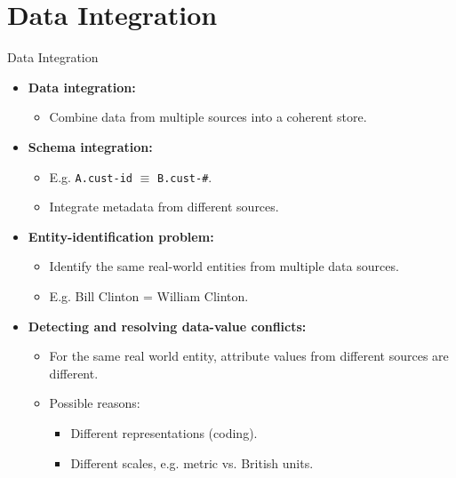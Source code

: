 \section{Data Integration}

\begin{frame}{Data Integration}
	\begin{itemize}
		\item \textbf{Data integration:}
		      \begin{itemize}
			      \item Combine data from multiple sources into a coherent store.
		      \end{itemize}
		\item \textbf{Schema integration:}
		      \begin{itemize}
			      \item E.g. \texttt{A.cust-id} $\equiv$ \texttt{B.cust-\#}.
			      \item Integrate metadata from different sources.
		      \end{itemize}
		\item \textbf{Entity-identification problem:}
		      \begin{itemize}
			      \item Identify the same real-world entities from multiple data
			            sources.
			      \item E.g. Bill Clinton = William Clinton.
		      \end{itemize}
		\item \textbf{Detecting and resolving {\color{airforceblue}data-value
					      conflicts}:}
		      \begin{itemize}
			      \item For the same real world entity, attribute values from
			            different sources are different.
			      \item Possible reasons:
			            \begin{itemize}
				            \item Different representations (coding).
				            \item Different scales, e.g. metric vs. British units.
			            \end{itemize}
		      \end{itemize}
	\end{itemize}
\end{frame}

